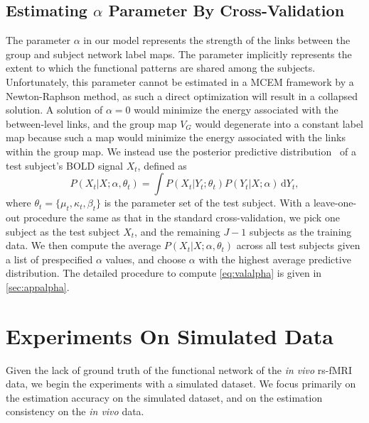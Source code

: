 \documentclass[review,authoryear]{elsarticle}
\begin{document}
\subsection{Estimating $\alpha$  Parameter By Cross-Validation}
\label{sec:alpha}
The parameter $\alpha$ in our model represents the strength of the links between
the group and subject network label maps. The parameter implicitly represents
the extent to which the functional patterns are shared among the
subjects. Unfortunately, this parameter cannot be estimated in a MCEM framework
by a Newton-Raphson method, as such a direct optimization will result in a
collapsed solution. A solution of $\alpha = 0$ would minimize the energy
associated with the between-level links, and the group map $V_G$ would
degenerate into a constant label map because such a map would minimize the
energy associated with the links within the group map. We instead use the
posterior predictive distribution~\citep{gelman2003bayesian} of a test subject's
BOLD signal $X_t$, defined as
\begin{equation}
P(X_t | X;\alpha, \theta_t) = \int \!P(X_t | Y_t; \theta_t) P(Y_t| X;\alpha)\, \textrm{d} Y_t,
\label{eq:valalpha}
\end{equation}
where $\theta_t = \{\mu_t, \kappa_t, \beta_t\}$ is the parameter set of the test
subject. With a leave-one-out procedure the same as that in the standard
cross-validation, we pick one subject as the test subject $X_t$, and the
remaining $J-1$ subjects as the training data. We then compute the average
$P(X_t | X;\alpha, \theta_t)$ across all test subjects given a list of prespecified
$\alpha$ values, and choose $\alpha$ with the highest average predictive
distribution. The detailed procedure to compute \eqref{eq:valalpha} is given in
\ref{sec:appalpha}.

\section{Experiments On Simulated Data}
\label{sec:synexperiments}
Given the lack of ground truth of the functional network of the \emph{in vivo}
rs-fMRI data, we begin the experiments with a simulated dataset. We focus
primarily on the estimation accuracy on the simulated dataset, and on the
estimation consistency on the \emph{in vivo} data.
\end{document}
